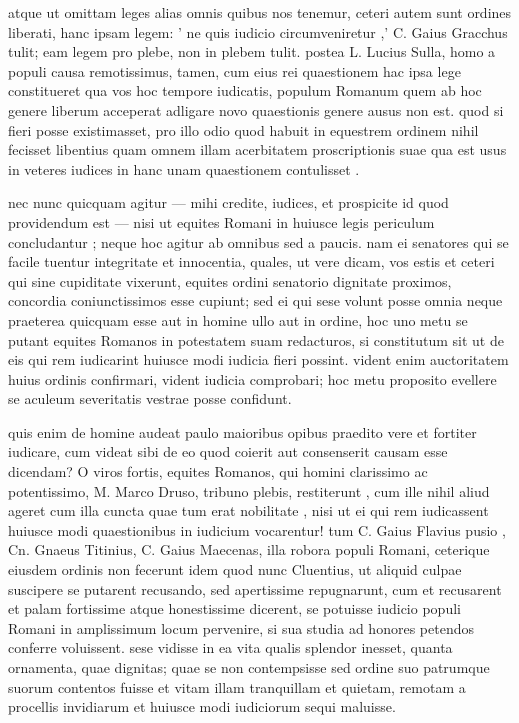  atque ut omittam leges alias omnis quibus nos tenemur, ceteri autem sunt ordines liberati, hanc ipsam legem: ' ne quis iudicio circumveniretur ,' C. Gaius Gracchus tulit; eam legem pro plebe, non in plebem tulit. postea L. Lucius Sulla, homo a populi causa remotissimus, tamen, cum eius rei quaestionem hac ipsa lege constitueret qua vos hoc tempore iudicatis, populum Romanum quem ab hoc genere liberum acceperat adligare novo quaestionis genere ausus non est. quod si fieri posse existimasset, pro illo odio quod habuit in equestrem ordinem nihil fecisset libentius quam omnem illam acerbitatem proscriptionis suae qua est usus in veteres iudices in hanc unam quaestionem contulisset .

 nec nunc quicquam agitur — mihi credite, iudices, et prospicite id quod providendum est — nisi ut equites Romani in huiusce legis periculum concludantur ; neque hoc agitur ab omnibus sed a paucis. nam ei senatores qui se facile tuentur integritate et innocentia, quales, ut vere dicam, vos estis et ceteri qui sine cupiditate vixerunt, equites ordini senatorio dignitate proximos, concordia coniunctissimos esse cupiunt; sed ei qui sese volunt posse omnia neque praeterea quicquam esse aut in homine ullo aut in ordine, hoc uno metu se putant equites Romanos in potestatem suam redacturos, si constitutum sit ut de eis qui rem iudicarint huiusce modi iudicia fieri possint. vident enim auctoritatem huius ordinis confirmari, vident iudicia comprobari; hoc metu proposito evellere se aculeum severitatis vestrae posse confidunt.

 quis enim de homine audeat paulo maioribus opibus praedito vere et fortiter iudicare, cum videat sibi de eo quod coierit aut consenserit causam esse dicendam? O viros fortis, equites Romanos, qui homini clarissimo ac potentissimo, M. Marco Druso, tribuno plebis, restiterunt , cum ille nihil aliud ageret cum illa cuncta quae tum erat nobilitate , nisi ut ei qui rem iudicassent huiusce modi quaestionibus in iudicium vocarentur! tum C. Gaius Flavius pusio , Cn. Gnaeus Titinius, C. Gaius Maecenas, illa robora populi Romani, ceterique eiusdem ordinis non fecerunt idem quod nunc Cluentius, ut aliquid culpae suscipere se putarent recusando, sed apertissime repugnarunt, cum et recusarent et palam fortissime atque honestissime dicerent, se potuisse iudicio populi Romani in amplissimum locum pervenire, si sua studia ad honores petendos conferre voluissent. sese vidisse in ea vita qualis splendor inesset, quanta ornamenta, quae dignitas; quae se non contempsisse sed ordine suo patrumque suorum contentos fuisse et vitam illam tranquillam et quietam, remotam a procellis invidiarum et huiusce modi iudiciorum sequi maluisse.

